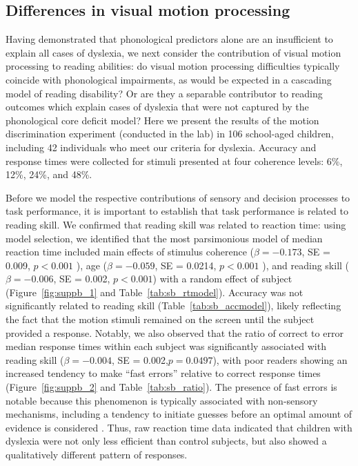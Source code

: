 \documentclass[../uwthesis.tex]{subfiles}
\begin{document}
\subsection{Differences in visual motion processing}
Having demonstrated that phonological predictors alone are an insufficient to explain all cases of dyslexia, we next consider the contribution of visual motion processing to reading abilities: do visual motion processing difficulties typically coincide with phonological impairments, as would be expected in a cascading model of reading disability? Or are they a separable contributor to reading outcomes which explain cases of dyslexia that were not captured by the phonological core deficit model? Here we present the results of the motion discrimination experiment (conducted in the lab) in 106 school-aged children, including 42 individuals who meet our criteria for dyslexia. Accuracy and response times were collected for stimuli presented at four coherence levels: 6\%, 12\%, 24\%, and 48\%.

Before we model the respective contributions of sensory and decision processes to task
performance, it is important to establish that task performance is related to reading skill. We confirmed that reading skill was related to reaction time: using model selection, we identified that the most parsimonious model of median reaction time included main effects of stimulus coherence ($\beta = -0.173$, SE = 0.009, $p < 0.001$ ), age ($\beta = -0.059$, SE = 0.0214, $p<0.001$ ), and reading skill ($\beta= -0.006$, SE = 0.002, $p<0.001$) with a random effect of subject (Figure~\ref{fig:suppb_1} and Table~\ref{tab:sb_rtmodel}). Accuracy was not significantly related to reading skill (Table~\ref{tab:sb_accmodel}), likely reflecting the fact that the motion stimuli remained on the screen until the subject provided a response. Notably, we also observed that the ratio of correct to error median response times within each subject was significantly associated with reading skill ($\beta = -0.004$, SE = 0.002,$p = 0.0497$), with poor readers showing an increased tendency to make “fast errors” relative to correct response times (Figure~\ref{fig:suppb_2} and Table~\ref{tab:sb_ratio}). The presence of fast errors is notable because this phenomenon is typically associated with non-sensory mechanisms, including a tendency to initiate guesses before an optimal amount of evidence is considered \citep{Smith2004PsychologyDecisions}. Thus, raw reaction time data indicated that children with dyslexia were not only less efficient than control subjects, but also showed a qualitatively different pattern of responses.
\end{document}
